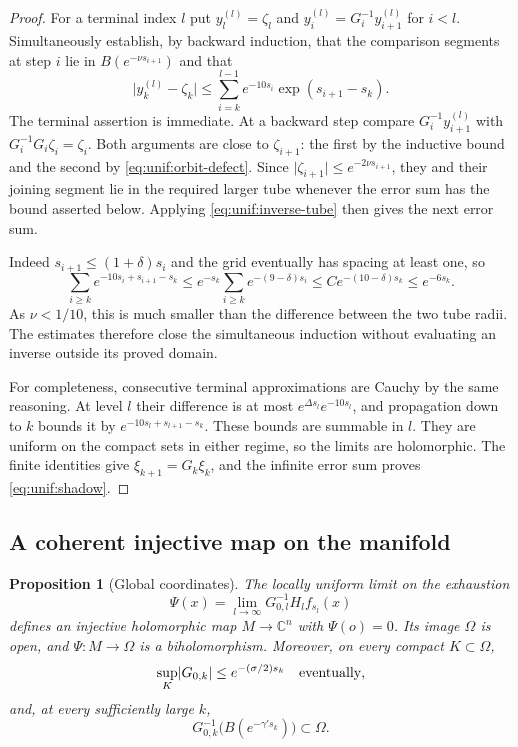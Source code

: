 \documentclass[11pt]{article}
\newtheorem{proposition}[theorem]{Proposition}
\theoremstyle{definition}
\theoremstyle{remark}
\newcommand{\C}{\mathbb C}
\newcommand{\abs}[1]{\lvert#1\rvert}
\numberwithin{equation}{section}
\begin{document}
\begin{proof}
For a terminal index $l$ put $y_l^{(l)}=\zeta_l$ and
$y_i^{(l)}=G_i^{-1}y_{i+1}^{(l)}$ for $i<l$.
Simultaneously establish, by backward induction, that the comparison
segments at step $i$ lie in $B(e^{-\nu s_{i+1}})$ and that
\begin{equation}
 \abs{y_k^{(l)}-\zeta_k}
 \le \sum_{i=k}^{l-1}
       e^{-10s_i}\exp(s_{i+1}-s_k).
 \label{eq:unif:finite-error-sum}
\end{equation}
The terminal assertion is immediate.  At a backward step compare
$G_i^{-1}y_{i+1}^{(l)}$ with
$G_i^{-1}G_i\zeta_i=\zeta_i$.
Both arguments are close to $\zeta_{i+1}$: the first by the inductive
bound and the second by \eqref{eq:unif:orbit-defect}.  Since
$\abs{\zeta_{i+1}}\le e^{-2\nu s_{i+1}}$, they and their joining
segment lie in the required larger tube whenever the error sum has
the bound asserted below.  Applying
\eqref{eq:unif:inverse-tube} then gives the next error sum.

Indeed $s_{i+1}\le(1+\delta)s_i$ and the grid eventually has spacing
at least one, so
\[
 \sum_{i\ge k}e^{-10s_i+s_{i+1}-s_k}
 \le e^{-s_k}\sum_{i\ge k}e^{-(9-\delta)s_i}
 \le C e^{-(10-\delta)s_k}\le e^{-6s_k}.
\]
As $\nu<1/10$, this is much smaller than the difference between the
two tube radii.  The estimates therefore close the simultaneous
induction without evaluating an inverse outside its proved domain.

For completeness, consecutive terminal approximations are Cauchy
by the same reasoning.  At level $l$ their difference is at most
$e^{\Delta s_l}e^{-10s_l}$, and propagation down to $k$ bounds it by
$e^{-10s_l+s_{l+1}-s_k}$.  These bounds are summable in $l$.
They are uniform on the compact sets in either regime, so the limits
are holomorphic.  The finite identities give
$\xi_{k+1}=G_k\xi_k$, and the infinite error sum proves
\eqref{eq:unif:shadow}.
\end{proof}

\subsection{A coherent injective map on the manifold}

\begin{proposition}[Global coordinates]\label{prop:global-coordinates}
The locally uniform limit on the exhaustion
\begin{equation}
 \Psi(x)=\lim_{l\to\infty}G_{0,l}^{-1}H_lf_{s_l}(x)
 \label{eq:unif:global-map}
\end{equation}
defines an injective holomorphic map $M\to\C^n$ with $\Psi(o)=0$.
Its image $\Omega$ is open, and $\Psi:M\to\Omega$ is a
biholomorphism.  Moreover, on every compact $K\subset\Omega$,
\begin{equation}
 \sup_K\abs{G_{0,k}}\le e^{-(\sigma/2)s_k}
 \quad\hbox{eventually},
 \label{eq:unif:forward-smallness}
\end{equation}
and, at every sufficiently large $k$,
\begin{equation}
 G_{0,k}^{-1}\bigl(B(e^{-\gamma's_k})\bigr)\subset\Omega.
 \label{eq:unif:inverse-ball-inclusion}
\end{equation}
\end{proposition}
\end{document}
